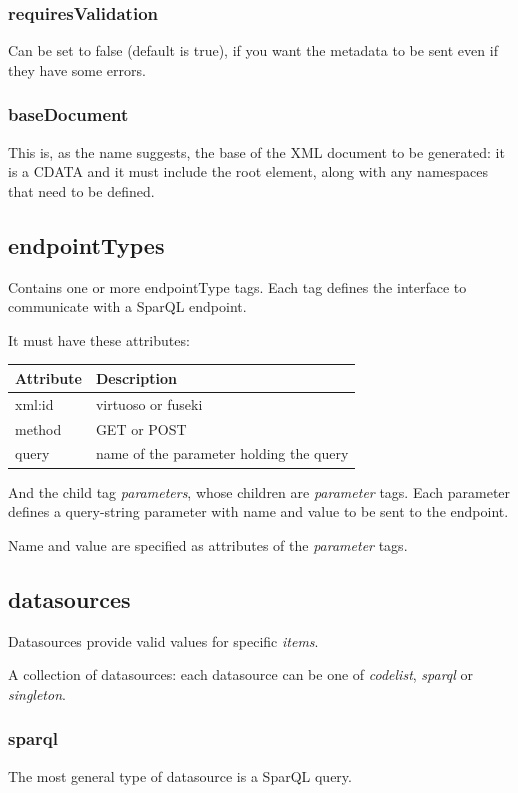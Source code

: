 \documentclass[10pt]{article}
\begin{document}
	\subsubsection{requiresValidation}
	Can be set to false (default is true), if you want the metadata to be sent even if they have some errors.
	
	\subsubsection{baseDocument}
	This is, as the name suggests, the base of the XML document to be generated: it is a CDATA and it must include the root element, along with any namespaces that need to be defined.
	
	\subsection{endpointTypes}
	Contains one or more endpointType tags.
	Each tag defines the interface to communicate with a SparQL endpoint.
	
	It must have these attributes:
	\begin{center}
		\begin{tabular}{ | p{} | p{} | }
			\hline
			Attribute & Description \\ 
			\hline
			xml:id & virtuoso or fuseki \\  
			\hline
			method & GET or POST \\
			\hline
			query & name of the parameter holding the query \\
			\hline
		\end{tabular}
	\end{center}
	
	And the child tag \textit{parameters}, whose children are \textit{parameter} tags.
	Each parameter defines a query-string parameter with name and value to be sent to the endpoint.
	
	Name and value are specified as attributes of the \textit{parameter} tags.
	
	\subsection{datasources}
	Datasources provide valid values for specific \textit{items}.
	
	A collection of datasources: each datasource can be one of \textit{codelist}, \textit{sparql} or \textit{singleton}.
	
	\subsubsection{sparql}
	The most general type of datasource is a SparQL query.
	
\end{document}
